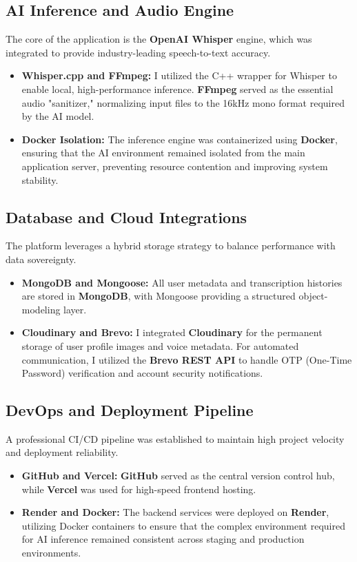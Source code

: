 \documentclass[oneside]{thesis-library}
\begin{document}
\subsection{AI Inference and Audio Engine}
The core of the application is the \textbf{OpenAI Whisper} engine, which was integrated to provide industry-leading speech-to-text accuracy.
\begin{itemize}
    \item \textbf{Whisper.cpp and FFmpeg:} I utilized the C++ wrapper for Whisper to enable local, high-performance inference. \textbf{FFmpeg} served as the essential audio "sanitizer," normalizing input files to the 16kHz mono format required by the AI model.
    \item \textbf{Docker Isolation:} The inference engine was containerized using \textbf{Docker}, ensuring that the AI environment remained isolated from the main application server, preventing resource contention and improving system stability.
\end{itemize}

\subsection{Database and Cloud Integrations}
The platform leverages a hybrid storage strategy to balance performance with data sovereignty.
\begin{itemize}
    \item \textbf{MongoDB and Mongoose:} All user metadata and transcription histories are stored in \textbf{MongoDB}, with Mongoose providing a structured object-modeling layer.
    \item \textbf{Cloudinary and Brevo:} I integrated \textbf{Cloudinary} for the permanent storage of user profile images and voice metadata. For automated communication, I utilized the \textbf{Brevo REST API} to handle OTP (One-Time Password) verification and account security notifications.
\end{itemize}

\subsection{DevOps and Deployment Pipeline}
A professional CI/CD pipeline was established to maintain high project velocity and deployment reliability.
\begin{itemize}
    \item \textbf{GitHub and Vercel:} \textbf{GitHub} served as the central version control hub, while \textbf{Vercel} was used for high-speed frontend hosting.
    \item \textbf{Render and Docker:} The backend services were deployed on \textbf{Render}, utilizing Docker containers to ensure that the complex environment required for AI inference remained consistent across staging and production environments.
\end{itemize}
\end{document}
